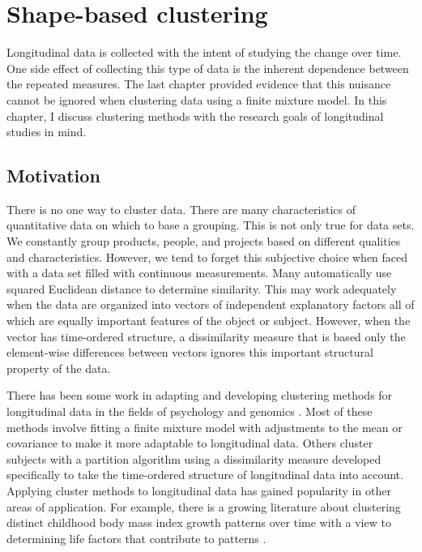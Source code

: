 \chapter{Shape-based clustering}
\label{chap:motivate}

Longitudinal data is collected with the intent of studying the change over time. One side effect of collecting this type of data is the inherent dependence between the repeated measures. The last chapter provided evidence that this nuisance cannot be ignored when clustering data using a finite mixture model. In this chapter, I discuss clustering methods with the research goals of longitudinal studies in mind. 

\section{Motivation}
There is no one way to cluster data. There are many characteristics of quantitative data on which to base a grouping. This is not only true for data sets. We constantly group products, people, and projects based on different qualities and characteristics. However, we tend to forget this subjective choice when faced with a data set filled with continuous measurements. Many automatically use squared Euclidean distance to determine similarity. This may work adequately when the data are organized into vectors of independent explanatory factors all of which are equally important features of the object or subject. However, when the vector has time-ordered structure, a dissimilarity measure that is based only the element-wise differences between vectors ignores this important structural property of the data.  

There has been some work in adapting and developing clustering methods for longitudinal data in the fields of psychology and genomics \cite{schneiderman1993,genolini2010, jones2001, muthen2010, mcnicholas2010}. Most of these methods involve fitting a finite mixture model with adjustments to the mean or covariance to make it more adaptable to longitudinal data. Others cluster subjects with a partition algorithm using a dissimilarity measure developed specifically to take the time-ordered structure of longitudinal data into account. Applying cluster methods to longitudinal data has gained popularity in other areas of application. For example, there is a growing literature about clustering distinct childhood body mass index growth patterns over time with a view to determining life factors that contribute to patterns \cite{pryor2011,carter2012}. 

